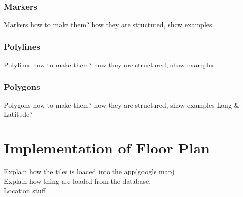 \subsubsection*{Markers}

Markers how to make them? how they are structured, show examples
\subsubsection*{Polylines}

Polylines how to make them? how they are structured, show examples
\subsubsection*{Polygons}

Polygons how to make them? how they are structured, show examples
Long \& Latitude?\\


\section*{Implementation of Floor Plan} 
Explain how the tiles is loaded into the app(google map)\\
Explain how thing are loaded from the database.\\
Location stuff
	
